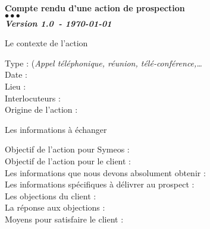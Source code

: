 \documentclass[a4paper, oneside, 12pt, french]{article}
\newcommand{\NUMREV}{Version 1.0}
\newcommand{\DATEREV}{\today}
\begin{document}
\newpage

\begin{center}
\huge \bf Compte rendu d'une action de prospection \\
\textcolor{Symeos_Red}{$\bullet \bullet$}\textcolor{Symeos_Grey}{$\bullet$}\\
\small \textit{\NUMREV \ - \DATEREV} 
\end{center}

\normalsize

{\Large Le contexte de l'action}

\begin{fminipage}
\vspace{12pt}
Type : (\textit{Appel téléphonique, réunion, télé-conférence,\dots}\\
\newline
Date : \\
\hspace*{10cm} Lieu : \\
Interlocuteurs : \\
\newline
Origine de l'action :\\
\newline
\end{fminipage}

{\Large Les informations à échanger}

\begin{fminipage}
\vspace{12pt}
Objectif de l'action pour Symeos : \\
\newline
\newline
Objectif de l'action pour le client :\\
\newline
\newline
Les informations que nous devons absolument obtenir :\\
\newline
\newline
Les informations spécifiques à délivrer au prospect : \\
\newline
\newline
Les objections du client :\\
\newline
\newline
La réponse aux objections :\\
\newline
\newline
Moyens pour satisfaire le client :\\
\newline
\newline
\end{fminipage}
\end{document}
